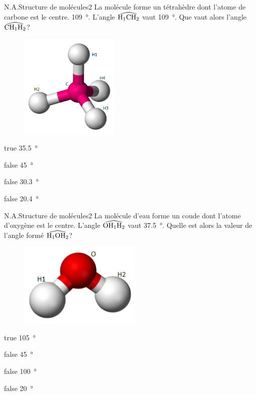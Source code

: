 \documentclass[11pt]{article}
\begin{document}
		\begin{question}{N.A.}{Structure de molécules}{2}{}
			La molécule  forme un tétrahèdre dont l'atome de carbone est le centre. \SI{109}{\degree}. L'angle $\widehat{\ce{H}_1\ce{C}\ce{H}_2}$ vaut \SI{109}{\degree}. Que vaut alors l'angle $\widehat{\ce{C}\ce{H}_1\ce{H}_2}$?
			\begin{figure}
				\centering
				\includegraphics[height = 5cm]{Antoine/Figures_Antoine/300px-Tetrahedral-3D-balls.png}
			\end{figure}
		\end{question}
		\begin{reponses}
			\item[true] \SI{35.5}{\degree}
			\item[false] \SI{45}{\degree}
			\item[false] \SI{30.3}{\degree}
			\item[false] \SI{20.4}{\degree}
		\end{reponses}
		
		\begin{question}{N.A.}{Structure de molécules}{2}{}
			La molécule d'eau forme un coude dont l'atome d'oxygène est le centre. L'angle $\widehat{\ce{O}\ce{H}_1\ce{H}_2}$ vaut \SI{37.5}{\degree}. Quelle est alors la valeur de l'angle formé $\widehat{\ce{H}_1\ce{O}\ce{H}_2}$?
			\begin{figure}
				\centering
				\includegraphics[height = 4cm]{Antoine/Figures_Antoine/240px-Water-3D-balls.png}
			\end{figure}
		\end{question}
			\begin{reponses}
			\item[true] \SI{105}{\degree}
			\item[false] \SI{45}{\degree}
			\item[false] \SI{100}{\degree}
			\item[false] \SI{20}{\degree}
			\end{reponses}
		
\end{document}
